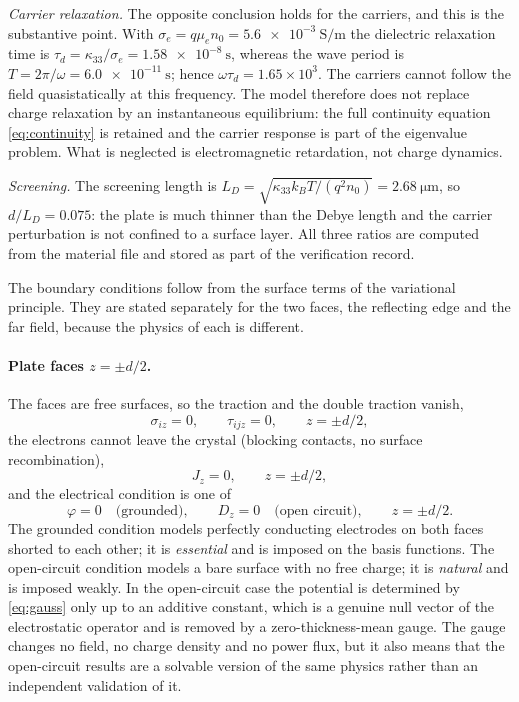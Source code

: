 \emph{Carrier relaxation.}  The opposite conclusion holds for the carriers, and
this is the substantive point.  With $\sigma_e=q\mu_en_0=\SI{5.6e-3}{\siemens
\per\metre}$ the dielectric relaxation time is
$\tau_d=\kappa_{33}/\sigma_e=\SI{1.58e-8}{\second}$, whereas the wave period is
$T=2\pi/\omega=\SI{6.0e-11}{\second}$; hence $\omega\tau_d=1.65\times10^{3}$.
The carriers cannot follow the field quasistatically at this frequency.  The
model therefore does not replace charge relaxation by an instantaneous
equilibrium: the full continuity equation \eqref{eq:continuity} is retained and
the carrier response is part of the eigenvalue problem.  What is neglected is
electromagnetic retardation, not charge dynamics.

\emph{Screening.}  The screening length is $L_D=\sqrt{\kappa_{33}k_BT/(q^2n_0)}
=\SI{2.68}{\micro\metre}$, so $d/L_D=0.075$: the plate is much thinner than the
Debye length and the carrier perturbation is not confined to a surface layer.
All three ratios are computed from the material file and stored as part of the
verification record.


The boundary conditions follow from the surface terms of the variational
principle.  They are stated separately for the two faces, the reflecting edge
and the far field, because the physics of each is different.

\paragraph{Plate faces $z=\pm d/2$.}  The faces are free surfaces, so the
traction and the double traction vanish,
\begin{equation}
\label{eq:bc_faces_mech}
\sigma_{iz}=0,\qquad \tau_{ijz}=0,\qquad z=\pm d/2,
\end{equation}
the electrons cannot leave the crystal (blocking contacts, no surface
recombination),
\begin{equation}
\label{eq:bc_faces_carrier}
J_z=0,\qquad z=\pm d/2,
\end{equation}
and the electrical condition is one of
\begin{equation}
\label{eq:bc_grounded}
\varphi=0\quad\text{(grounded)},\qquad
D_z=0\quad\text{(open circuit)},\qquad z=\pm d/2 .
\end{equation}
The grounded condition models perfectly conducting electrodes on both faces
shorted to each other; it is \emph{essential} and is imposed on the basis
functions.  The open-circuit condition models a bare surface with no free
charge; it is \emph{natural} and is imposed weakly.  In the open-circuit case
the potential is determined by \eqref{eq:gauss} only up to an additive constant,
which is a genuine null vector of the electrostatic operator and is removed by a
zero-thickness-mean gauge.  The gauge changes no field, no charge density and no
power flux, but it also means that the open-circuit results are a solvable
version of the same physics rather than an independent validation of it.


